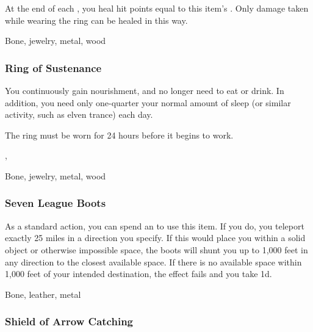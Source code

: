 At the end of each , you heal hit points equal to this item's .
Only damage taken while wearing the ring can be healed in this way.



 


 Bone, jewelry, metal, wood


\lowercase{\hypertarget{item:Ring of Sustenance}{}}\label{item:Ring of Sustenance}
\hypertarget{item:Ring of Sustenance}{\subsubsection{Ring of Sustenance\hfill{}}}

You continuously gain nourishment, and no longer need to eat or drink.
In addition, you need only one-quarter your normal amount of sleep (or similar activity, such as elven trance) each day.

The ring must be worn for 24 hours before it begins to work.



 , 


 Bone, jewelry, metal, wood


\lowercase{\hypertarget{item:Seven League Boots}{}}\label{item:Seven League Boots}
\hypertarget{item:Seven League Boots}{\subsubsection{Seven League Boots\hfill{}}}

As a standard action, you can spend an  to use this item.
If you do, you teleport exactly 25 miles in a direction you specify.
If this would place you within a solid object or otherwise impossible space, the boots will shunt you up to 1,000 feet in any direction to the closest available space.
If there is no available space within 1,000 feet of your intended destination, the effect fails and you take  \minus1d.



 


 Bone, leather, metal


\lowercase{\hypertarget{item:Shield of Arrow Catching}{}}\label{item:Shield of Arrow Catching}
\hypertarget{item:Shield of Arrow Catching}{\subsubsection{Shield of Arrow Catching\hfill{}}}

